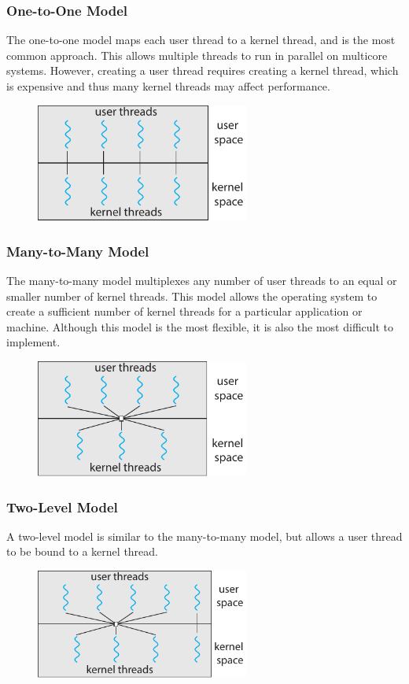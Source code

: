 \documentclass{article}
\begin{document}
\subsubsection{One-to-One Model}
The one-to-one model maps each user thread to a kernel thread, and is
the most common approach. This allows multiple threads to run in
parallel on multicore systems. However, creating a user thread requires
creating a kernel thread, which is expensive and thus many kernel
threads may affect performance.
\begin{figure}[H]
    \centering
    \includegraphics[width = 7cm]{figures/threads_one_to_one.pdf}
\end{figure}
\subsubsection{Many-to-Many Model}
The many-to-many model multiplexes any number of user threads to an
equal or smaller number of kernel threads. This model allows the
operating system to create a sufficient number of kernel threads for a
particular application or machine. Although this model is the most
flexible, it is also the most difficult to implement.
\begin{figure}[H]
    \centering
    \includegraphics[width = 7cm]{figures/threads_many_to_many.pdf}
\end{figure}
\subsubsection{Two-Level Model}
A two-level model is similar to the many-to-many model, but allows a
user thread to be bound to a kernel thread.
\begin{figure}[H]
    \centering
    \includegraphics[width = 7cm]{figures/threads_two_level.pdf}
\end{figure}
\end{document}

